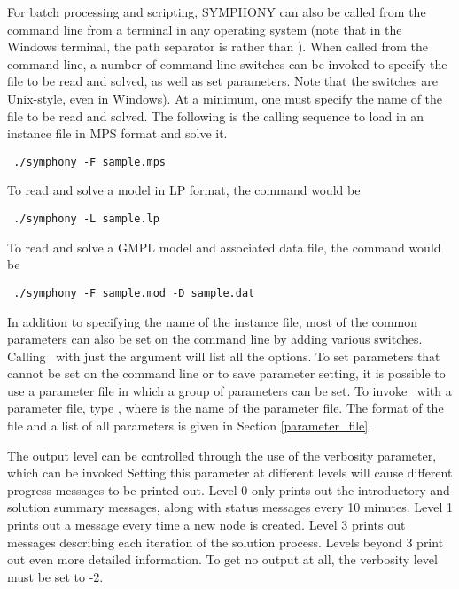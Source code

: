 For batch processing and scripting, SYMPHONY can also be called from the
command line from a terminal in any operating system (note that in the Windows
terminal, the path separator is \code{\bs} rather than \code{/}).
When called from the command line, a number of command-line switches can be
invoked to specify the file to be read and solved, as well as set parameters.
Note that the switches are Unix-style, even in Windows). At a minimum, one must
specify the name of the file to be read and solved. The following is the
calling sequence to load in an instance file in MPS format and 
solve it.
{\color{Brown}
\begin{verbatim}
 ./symphony -F sample.mps
\end{verbatim}
} 
To read and solve a model in LP format, the command would be
{\color{Brown}
\begin{verbatim}
 ./symphony -L sample.lp
\end{verbatim}
} 
To read and solve a GMPL model and associated data file, the command would be
{\color{Brown}
\begin{verbatim}
 ./symphony -F sample.mod -D sample.dat
\end{verbatim}
} 
In addition to specifying the name of the instance file, most of the common
parameters can also be set on the command line by adding various switches.
Calling \BB\ with just the argument  will list all the options. To
set parameters that cannot be set on the command line or to save parameter
setting, it is possible to use a parameter file in which a group of parameters
can be set. To invoke \BB\ with a parameter file, type , where  is the name of the parameter file. The format
of the file and a list of all parameters is given in Section
\ref{parameter_file}.

The output level can be controlled through the use of the verbosity parameter,
which can be invoked Setting this parameter at different levels will cause
different progress messages to be printed out. Level 0 only prints out the
introductory and solution summary messages, along with status messages every
10 minutes. Level 1 prints out a message every time a new node is created.
Level 3 prints out messages describing each iteration of the solution process.
Levels beyond 3 print out even more detailed information. To get no output at
all, the verbosity level must be set to -2.


